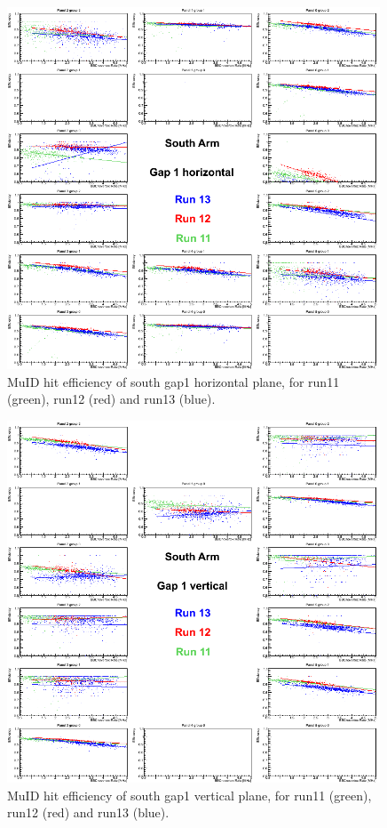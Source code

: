 \begin{center}
  \begin{figure}[p]
    \includegraphics[width=0.99\textwidth]{./figures/efficomp_South_gap1_horizontal.png}
    \caption{\label{Fig:efficiency:MuIdEff:a0g1p0}MuID hit efficiency of south gap1 horizontal plane, for run11 (green), run12 (red) and run13 (blue).}
  \end{figure}
\end{center}
\begin{center}
  \begin{figure}[p]
    \includegraphics[width=0.99\textwidth]{./figures/efficomp_South_gap1_vertical.png}
    \caption{\label{Fig:efficiency:MuIdEff:a0g1p1}MuID hit efficiency of south gap1 vertical plane, for run11 (green), run12 (red) and run13 (blue).}
  \end{figure}
\end{center}
